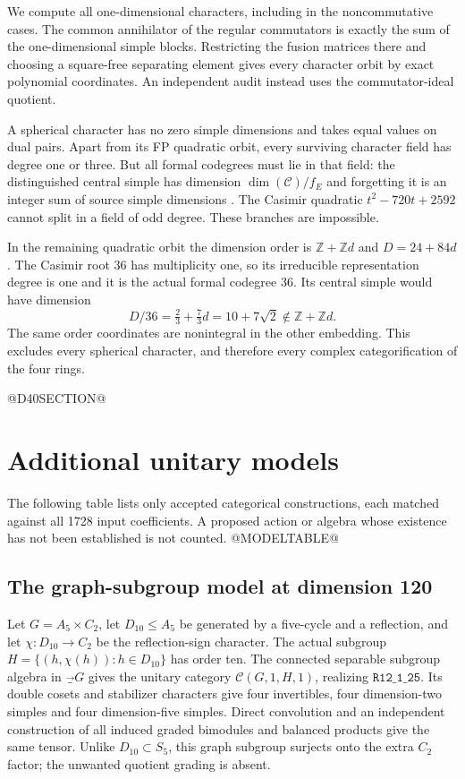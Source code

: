 \documentclass[11pt]{article}
\newcommand{\ring}[1]{\texttt{R12\_1\_#1}}
\begin{document}
We compute all one-dimensional characters, including in the noncommutative cases.
The common annihilator of the regular commutators is exactly the sum of the
one-dimensional simple blocks. Restricting the fusion matrices there and choosing
a square-free separating element gives every character orbit by exact polynomial
coordinates. An independent audit instead uses the commutator-ideal quotient.

A spherical character has no zero simple dimensions and takes equal values on
dual pairs. Apart from its FP quadratic orbit, every surviving character field has
degree one or three. But all formal codegrees must lie in that field: the
distinguished central simple has dimension $\dim(\mathcal C)/f_E$ and forgetting it
is an integer sum of source simple dimensions \cite{Ostrik}. The Casimir quadratic
$t^2-720t+2592$ cannot split in a field of odd degree. These branches are impossible.

In the remaining quadratic orbit the dimension order is $\mathbb Z+\mathbb Z d$
and $D=24+84d$. The Casimir root 36 has multiplicity one, so its irreducible
representation degree is one and it is the actual formal codegree 36. Its central
simple would have dimension
\[
 D/36=\tfrac23+\tfrac73d=10+7\sqrt2\notin\mathbb Z+\mathbb Z d.
\]
The same order coordinates are nonintegral in the other embedding. This excludes
every spherical character, and therefore every complex categorification of the four rings.

@D40SECTION@

\section{Additional unitary models}
The following table lists only accepted categorical constructions, each matched
against all 1728 input coefficients. A proposed action or algebra whose existence
has not been established is not counted.
@MODELTABLE@

\subsection*{The graph-subgroup model at dimension 120}
Let $G=A_5\times C_2$, let $D_{10}\leq A_5$ be generated by a five-cycle and a
reflection, and let $\chi:D_{10}\to C_2$ be the reflection-sign character. The
actual subgroup $H=\{(h,\chi(h)):h\in D_{10}\}$ has order ten. The connected
separable subgroup algebra in $\Vec_G$ gives the unitary category
$\mathcal C(G,1,H,1)$, realizing $\ring{25}$.
Its double cosets and stabilizer characters give four invertibles, four
dimension-two simples and four dimension-five simples. Direct convolution and
an independent construction of all induced graded bimodules and balanced products
give the same tensor. Unlike $D_{10}\subset S_5$, this graph subgroup surjects
onto the extra $C_2$ factor; the unwanted quotient grading is absent.
\end{document}
